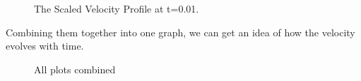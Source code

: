 \documentclass{article}
\begin{document}
  \begin{figure}[H]
    \centering
    \noindent{}
    \caption{The Scaled Velocity Profile at t=0.01.} \label{fig:44}
  \end{figure}
  
  Combining them together into one graph, we can get an idea of how the velocity evolves with time.
  \begin{figure}[H]
    \centering
    \noindent{}
    \caption{All plots combined} \label{fig:all}
  \end{figure}
  
\end{document}
